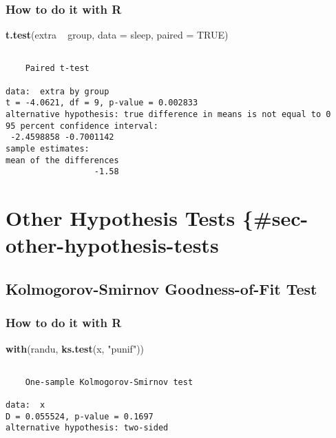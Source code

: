 \documentclass[]{book}
\newenvironment{Shaded}{\begin{snugshade}}{\end{snugshade}}
\newcommand{\KeywordTok}[1]{\textcolor[rgb]{0.13,0.29,0.53}{\textbf{{#1}}}}
\newcommand{\DataTypeTok}[1]{\textcolor[rgb]{0.13,0.29,0.53}{{#1}}}
\newcommand{\StringTok}[1]{\textcolor[rgb]{0.31,0.60,0.02}{{#1}}}
\newcommand{\OtherTok}[1]{\textcolor[rgb]{0.56,0.35,0.01}{{#1}}}
\newcommand{\NormalTok}[1]{{#1}}
\numberwithin{equation}{chapter}
\numberwithin{figure}{chapter}
\theoremstyle{plain}
\theoremstyle{definition}
\theoremstyle{remark}
\theoremstyle{definition}
\theoremstyle{definition}
\theoremstyle{remark}
\begin{document}
\subsubsection{How to do it with R}\label{how-to-do-it-with-r-42}

\begin{Shaded}
\begin{Highlighting}[]
\KeywordTok{t.test}\NormalTok{(extra ~}\StringTok{ }\NormalTok{group, }\DataTypeTok{data =} \NormalTok{sleep, }\DataTypeTok{paired =} \OtherTok{TRUE}\NormalTok{)}
\end{Highlighting}
\end{Shaded}

\begin{verbatim}

    Paired t-test

data:  extra by group
t = -4.0621, df = 9, p-value = 0.002833
alternative hypothesis: true difference in means is not equal to 0
95 percent confidence interval:
 -2.4598858 -0.7001142
sample estimates:
mean of the differences 
                  -1.58 
\end{verbatim}

\section{Other Hypothesis Tests
\{\#sec-other-hypothesis-tests}\label{other-hypothesis-tests-sec-other-hypothesis-tests}

\subsection{Kolmogorov-Smirnov Goodness-of-Fit
Test}\label{sub-kolmogorov-smirnov-goodness-of-fit-test}

\subsubsection{How to do it with R}\label{how-to-do-it-with-r-43}

\begin{Shaded}
\begin{Highlighting}[]
\KeywordTok{with}\NormalTok{(randu, }\KeywordTok{ks.test}\NormalTok{(x, }\StringTok{"punif"}\NormalTok{))}
\end{Highlighting}
\end{Shaded}

\begin{verbatim}

    One-sample Kolmogorov-Smirnov test

data:  x
D = 0.055524, p-value = 0.1697
alternative hypothesis: two-sided
\end{verbatim}
\end{document}
